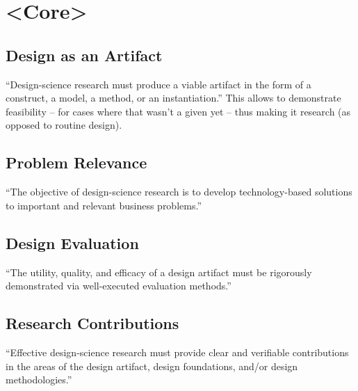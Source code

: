 \chapter{<Core>}

\section{Design as an Artifact}
``Design-science research must produce a viable artifact in the form of a construct, a model, a method, or an instantiation.'' This allows to demonstrate feasibility -- for cases where that wasn't a given yet -- thus making it research (as opposed to routine design).


\section{Problem Relevance}
``The objective of design-science research is to develop technology-based solutions to important and relevant business problems.''


\section{Design Evaluation}
``The utility, quality, and efficacy of a design artifact must be rigorously demonstrated via well-executed evaluation methods.''

\section{Research Contributions}
``Effective design-science research must provide clear and verifiable contributions in the areas of the design artifact, design foundations, and/or design methodologies.''

